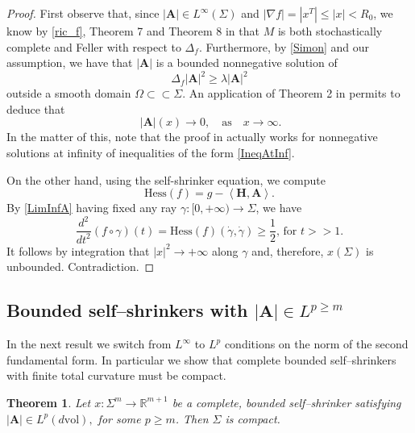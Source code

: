 \documentclass[11pt,leqno]{amsart}\usepackage{amsmath}
\newtheorem{theorem}{Theorem}
\numberwithin{equation}{section}
\begin{document}
\begin{proof}
First observe that, since $|\mathbf{A}|\in L^{\infty}(\Sigma)$ and $|\nabla f|=|x^T|\leq |x|<R_{0}$, we know by \eqref{ric_f}, Theorem 7 and Theorem 8 in \cite{BPS-RevMatIb} that $M$ is both stochastically complete and Feller with respect to $\Delta_f$. Furthermore, by \eqref{Simon} and our assumption, we have that $|\mathbf{A}|$ is a bounded nonnegative solution of
\begin{equation}\label{IneqAtInf}
\Delta_f|\mathbf{A}|^2\geq\lambda|\mathbf{A}|^2
\end{equation}
outside a smooth domain $\Omega\subset\subset \Sigma$.
An application of Theorem 2 in \cite{BPS-RevMatIb} permits to deduce that
\begin{equation}\label{LimInfA}
\ |\mathbf{A}|(x)\to0,\quad\mathrm{as}\quad x\to\infty.
\end{equation}
In the matter of this, note that the proof in \cite{BPS-RevMatIb} actually works for nonnegative solutions at infinity of inequalities of the form \eqref{IneqAtInf}.

On the other hand, using the self-shrinker equation, we compute\[
\mathrm{Hess}\left(  f\right)  =g-\left\langle
\mathbf{H},\mathbf{A}\right\rangle .
\]
By \eqref{LimInfA} having fixed any ray $\gamma:[0,+\infty)\rightarrow\Sigma$, we have\[
\frac{d^{2}}{dt^{2}}\left(  f\circ\gamma\right)
\left(  t\right)  =\mathrm{Hess}\left(  f\right)
\left(  \dot{\gamma},\dot{\gamma}\right)  \geq \frac{1}{2}\text{, for }t>>1.
\]
It follows by integration that $|x|^{2}\rightarrow
+\infty$ along $\gamma$ and, therefore, $x\left(  \Sigma\right)  $ is
unbounded. Contradiction.
\end{proof}

\subsection{Bounded self--shrinkers with $|\mathbf{A}|\in L^{p\geq m}$}

In the next result we switch from $L^{\infty}$ to $L^p$ conditions on the norm of the second fundamental form. In particular we show that complete bounded self--shrinkers with finite total curvature must be compact.
\begin{theorem}
Let $x:\Sigma^{m}  \rightarrow\mathbb{R}^{m+1}$ be a
complete, bounded self--shrinker satisfying $\left\vert \mathbf{A}\right\vert \in L^{p}\left(  d\mathrm{vol}\right),$ for some $p\geq m$. Then $\Sigma$ is compact.
\end{theorem}
\end{document}
